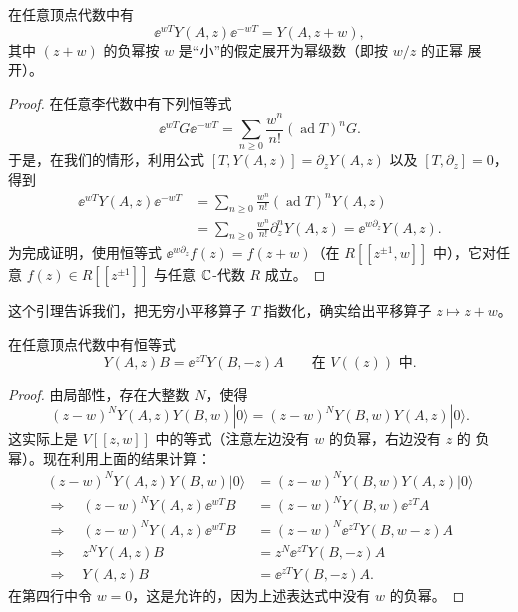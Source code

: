 \renewcommand{\thelemma}{2.3.2}
\begin{lemma}
    在任意顶点代数中有
    \[
        \ee^{wT}Y(A,z)\ee^{-wT}=Y(A,z+w),
    \]
    其中 $(z+w)$ 的负幂按 $w$ 是“小”的假定展开为幂级数（即按 $w/z$ 的正幂
    展开）。
\end{lemma}

\begin{proof}
    在任意李代数中有下列恒等式
    \[
        \ee^{wT}G\ee^{-wT}=\sum_{n\ge0}\frac{w^n}{n!}
        (\operatorname{ad}T)^nG.
    \]
    于是，在我们的情形，利用公式 $[T,Y(A,z)]=\partial_zY(A,z)$ 以及
    $[T,\partial_z]=0$，得到
    \[
        \begin{aligned}
            \ee^{wT}Y(A,z)\ee^{-wT}
            &=\sum_{n\ge0}\frac{w^n}{n!}(\operatorname{ad}T)^nY(A,z)\\
            &=\sum_{n\ge0}\frac{w^n}{n!}\partial_z^nY(A,z)
            =\ee^{w\partial_z}Y(A,z).
        \end{aligned}
    \]
    为完成证明，使用恒等式 $\ee^{w\partial_z}f(z)=f(z+w)$（在
    $R[[z^{\pm1},w]]$ 中），它对任意 $f(z)\in R[[z^{\pm1}]]$ 与任意
    $\mathbb{C}$-代数 $R$ 成立。
\end{proof}

这个引理告诉我们，把无穷小平移算子 $T$ 指数化，确实给出平移算子
$z\mapsto z+w$。

\renewcommand{\theproposition}{2.3.2}
\begin{proposition}[斜对称]
    在任意顶点代数中有恒等式
    \[
        Y(A,z)B=\ee^{zT}Y(B,-z)A\qquad\text{在 }V(\!(z)\!)\text{ 中}.
    \]
\end{proposition}

\begin{proof}
    由局部性，存在大整数 $N$，使得
    \[
        (z-w)^NY(A,z)Y(B,w)|0\rangle
        =(z-w)^NY(B,w)Y(A,z)|0\rangle.
    \]
    这实际上是 $V[[z,w]]$ 中的等式（注意左边没有 $w$ 的负幂，右边没有 $z$ 的
    负幂）。现在利用上面的结果计算：
    \[
        \begin{aligned}
            (z-w)^NY(A,z)Y(B,w)|0\rangle
            &=(z-w)^NY(B,w)Y(A,z)|0\rangle\\
            \Longrightarrow\quad
            (z-w)^NY(A,z)\ee^{wT}B
            &=(z-w)^NY(B,w)\ee^{zT}A\\
            \Longrightarrow\quad
            (z-w)^NY(A,z)\ee^{wT}B
            &=(z-w)^N\ee^{zT}Y(B,w-z)A\\
            \Longrightarrow\quad
            z^NY(A,z)B
            &=z^N\ee^{zT}Y(B,-z)A\\
            \Longrightarrow\quad
            Y(A,z)B
            &=\ee^{zT}Y(B,-z)A.
        \end{aligned}
    \]
    在第四行中令 $w=0$，这是允许的，因为上述表达式中没有 $w$ 的负幂。
\end{proof}

